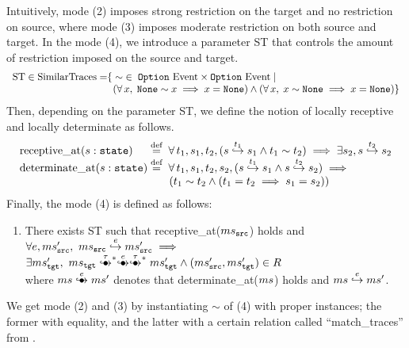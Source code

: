 Intuitively, mode (2) imposes strong restriction on the target and no restriction on source, where mode (3) imposes moderate restriction on both source and target.
In the mode (4), we introduce a parameter ST that controls the amount of restriction imposed on the source and target.
\[
\begin{array}{l@{}l}
\textrm{ST} \in \textrm{SimilarTraces} = & \{\; \sim \; \in \; \option \Events \times \option \Events \;|\; \\
                         & \;\; (\forall \, x, \; \none \sim x \implies x = \none) \land (\forall \, x, \; x \sim \none \implies x = \none) \}
\end{array}
\]
Then, depending on the parameter ST, we define the notion of locally receptive and locally determinate as follows.
\[
\begin{array}{l@{}l}
\textrm{receptive\_at} (s: \texttt{state})   & \; \defeq \; \forall \, t_1, s_1, t_2, (s \estep{t_1} s_1 \land t_1 \sim t_2) \implies \exists s_2, s \estep{t_2} s_2 \\
\textrm{determinate\_at} (s: \texttt{state}) & \; \defeq \; \forall \, t_1, s_1, t_2, s_2, (s \estep{t_1} s_1 \land s \estep{t_2} s_2) \implies \\
                                             & \;\;\;\;\;\;\; (t_1 \sim t_2 \land (t_1 = t_2 \implies s_1 = s_2)) \\
\end{array}
\]
Finally, the mode (4) is defined as follows:
\begin{enumerate}[resume]
\item There exists ST such that receptive\_at($ms{}_{\texttt{src}{}}$) holds and\\
  $\forall e, ms{}_{\texttt{src}{}}',~ ms{}_{\texttt{src}{}} \stackrel{e}{\hookrightarrow} ms{}_{\texttt{src}{}}' \implies {} $ \\
  $ \exists \mstgt',~ \mstgt \exstep{\tau}^{\raisebox{-1mm}{\scriptsize$\ast$}} \exstep{e}\exstep{\tau}^{\raisebox{-1mm}{\scriptsize$\ast$}} \mstgt' \land (\mssrc', \mstgt') \in R$\\
  where $\ms \exstep{e} \ms'$ denotes that determinate\_at($ms$) holds and $ms \stackrel{e}{\hookrightarrow} ms'$.
\end{enumerate}

We get mode (2) and (3) by instantiating $\sim$ of (4) with proper instances; the former with equality, and the latter with a certain relation called ``match\_traces'' from \cc{}.

